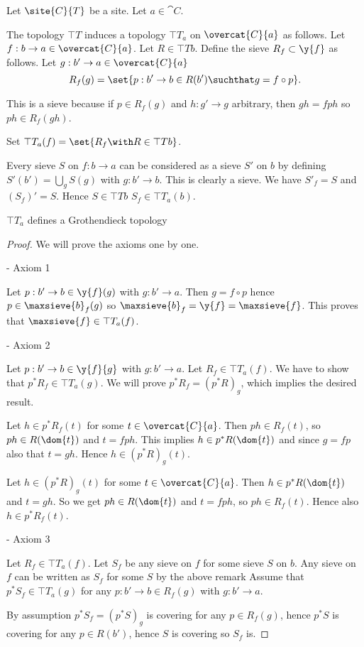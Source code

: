\begin{definition}
Let $\site{C}{T}$ be a site.
Let $a \in \cat{C}$.

The topology $\top{T}$ induces a topology $\top{T}_a$
on $\overcat{C}{a}$ as follows.
Let $f : b \rightarrow a \in \overcat{C}{a}$.
Let $R \in \top{T}{b}$.
Define the sieve $R_f \subset \y{f}$ as follows.
Let $g : b' \rightarrow a \in \overcat{C}{a}$
\[ R_f(g) = \set{p: b' \rightarrow b \in R(b') \suchthat g = f \circ p}.
\]

This is a sieve because if $p\in R_f(g)$ 
and $h : g' \rightarrow g$ arbitrary, 
then $gh=fph$ so $ph \in R_f(gh)$.

Set $\top{T}_a(f) = \set{ R_f \with R \in \top{T}{b}}$.

\end{definition}

\begin{remark}
Every sieve $S$ on $f: b \rightarrow a$ can be considered as a sieve $S'$
on $b$ by defining $S'(b') = \bigcup_g S(g)$ 
with $g: b' \rightarrow b$.
This is clearly a sieve.
We have $S'_f = S$ and $(S_f)' = S$.
Hence $S\in \top{T}{b}$ \iff $S_f\in \top{T}_a(b)$.
\end{remark}

\begin{lemma}
$\top{T}_a$ defines a Grothendieck topology
\end{lemma}

\begin{proof}
We will prove the axioms one by one.

- Axiom 1

Let $p: b' \rightarrow b \in \y{f}(g)$ with $g: b' \rightarrow a$.
Then $g = f \circ p$ hence $p \in \maxsieve{b}_f(g)$
so $\maxsieve{b}_f = \y{f} = \maxsieve{f}$. 
This proves that $\maxsieve{f} \in \top{T}_a(f)$.

- Axiom 2

Let $p: b' \rightarrow b \in \y{f}{g}$ with $g: b' \rightarrow a$.
Let $R_f \in \top{T}_a(f)$.
We have to show that $p^*R_f \in \top{T}_a(g)$.
We will prove $p^*R_f = (p^*R)_g$, which implies the desired result.

Let $h \in p^*R_f(t)$ for some $t\in \overcat{C}{a}$. 
Then $ph \in R_f(t)$, so $ph \in R(\dom{t})$ and $t = fph$.
This implies $h\in p^*R(\dom{t})$ and since $g = fp$ also that $t = gh$.
Hence $h\in (p^*R)_g(t)$.

Let $h \in (p^*R)_g(t)$ for some $t\in \overcat{C}{a}$.
Then $h \in p^*R(\dom{t})$ and $t = gh$.
So we get $ph \in R(\dom{t})$ and $t = fph$, 
so $ph\in R_f(t)$.
Hence also $h\in p^*R_f(t)$.

- Axiom 3

Let $R_f \in \top{T}_a(f)$.
Let $S_f$ be any sieve on $f$ for some sieve $S$ on $b$.
Any sieve on $f$ can be written as $S_f$ for some $S$ by the above remark %
Assume that $p^*S_f \in \top{T}_a(g)$ 
for any $p: b' \rightarrow b \in R_f(g)$
with $g: b' \rightarrow a$.

By assumption $p^*S_f = (p^*S)_g$ is covering for any $p \in R_f(g)$,
hence $p^*S$ is covering for any $p \in R(b')$, 
hence $S$ is covering so $S_f$ is.
\end{proof}